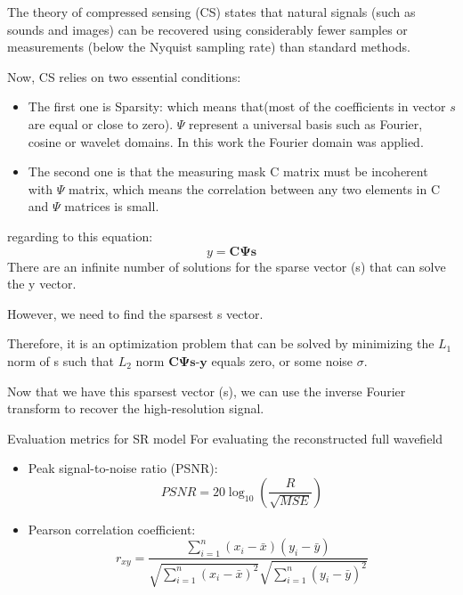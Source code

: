 \documentclass[10pt,aspectratio=169,dvipsnames]{beamer} %
\newcommand{\bs}[1]{\boldsymbol{#1}}
\begin{document}
	\note
	{	
		\tiny
		The theory of compressed sensing (CS) states that natural signals (such as sounds and images) can be recovered using considerably fewer samples or measurements (below the Nyquist sampling rate) than standard methods.
		
		Now, CS relies on two essential conditions: 	
		\begin{itemize}
			\item The first one is Sparsity: which means that(\alert{most of the coefficients in vector \(s\) are equal or close to zero}).
			$\Psi$ represent a universal basis such as Fourier, cosine or wavelet domains.
			In this work the Fourier domain was applied. 
			\item The second one is that the measuring mask C matrix must be incoherent with \(\Psi\) matrix, which means the correlation between any two elements in C and $\Psi$ matrices is small.
		\end{itemize}		
		
		regarding to this equation: 
		\begin{equation}
			y = \bs{C}\bs{\Psi}\bs{s}
		\end{equation}
		There are an infinite number of solutions for the sparse vector (s) that can solve the y vector.
		
		However, we need to find the sparsest s vector.
		
		Therefore, it is an optimization problem that can be solved by minimizing the \(L_1\) norm of s such that \(L_2\) norm \(\bs{C}\bs{\Psi}\bs{s}\)-\(\bs{y}\) equals zero, or some noise $\sigma$.
		
		Now that we have this sparsest vector (s), we can use the inverse Fourier transform to recover the high-resolution signal.		
		
	}
	\setcounter{subfigure}{0}
	\begin{frame}{Evaluation metrics for SR model}
		For evaluating the reconstructed full wavefield
		\begin{itemize}
			\item Peak signal-to-noise ratio (PSNR):
			\begin{equation*}
				PSNR=20\log_{10}\left(\frac{R}{\sqrt{MSE}}\right)
				\label{PSNR}
			\end{equation*}
			\item Pearson correlation coefficient:
			\begin{equation*}
				r_{xy} = \frac{\sum_{i=1}^{n}(x_i - \bar{x})(y_i-\bar{y})}{\sqrt{\sum_{i=1}^{n}(x_i - \bar{x})^2}\sqrt{\sum_{i=1}^{n}(y_i - \bar{y})^2}}
				\label{Pearson}
			\end{equation*}
		\end{itemize}
	\end{frame}
\end{document}
